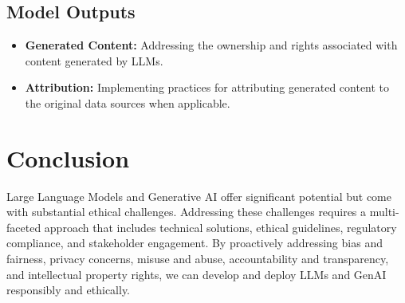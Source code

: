\subsection{Model Outputs}
\begin{itemize}
    \item \textbf{Generated Content:} Addressing the ownership and rights associated with content generated by LLMs.
    \item \textbf{Attribution:} Implementing practices for attributing generated content to the original data sources when applicable.
\end{itemize}

\section{Conclusion}
Large Language Models and Generative AI offer significant potential but come with substantial ethical challenges. Addressing these challenges requires a multi-faceted approach that includes technical solutions, ethical guidelines, regulatory compliance, and stakeholder engagement. By proactively addressing bias and fairness, privacy concerns, misuse and abuse, accountability and transparency, and intellectual property rights, we can develop and deploy LLMs and GenAI responsibly and ethically.


